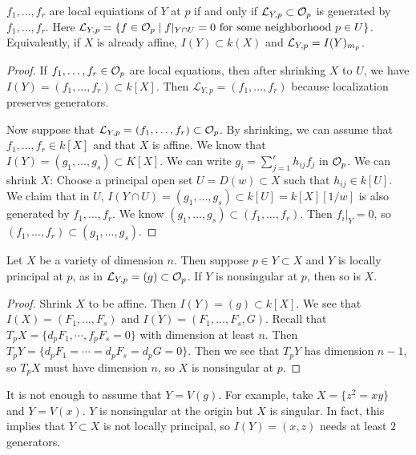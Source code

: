 \documentclass[twoside, 10pt]{article}
\begin{document}
    \begin{lem}
        $f_1, \ldots, f_r$ are local equiations of $Y$ at $p$ if and only if $\mathcal{L}_{Y,p} \subset \mathcal{O}_p$ is generated by $f_1, \ldots, f_r$. Here $\mathcal{L}_{Y,p} = \{f \in \mathcal{O}_p \mid f|_{Y \cap U} = 0 \text{ for some neighborhood } p \in U \}$. Equivalently, if $X$ is already affine, $I(Y) \subset k(X)$ and $\mathcal{L}_{Y,p} = I(Y)_{m_p}$.
        \begin{proof}
            If $f_1, \ldots, f_r \in \mathcal{O}_p$ are local equations, then after shrinking $X$ to $U$, we have $I(Y) = (f_1, \ldots, f_r) \subset k[X]$. Then $\mathcal{L}_{Y,p} = (f_1, \ldots, f_r)$ because localization preserves generators.

            Now suppose that $\mathcal{L}_{Y,p} = (f_1, \ldots, f_r) \subset \mathcal{O}_p$. By shrinking, we can assume that $f_1, \ldots, f_r \in k[X]$ and that $X$ is affine. We know that $I(Y) = (g_1, \ldots, g_s) \subset K[X]$. We can write $g_i = \sum_{j=1}^r h_{ij}f_j$ in $\mathcal{O}_p$. We can shrink $X$: Choose a principal open set $U = D(w) \subset X$ such that $h_{ij} \in k[U]$. We claim that in $U$, $I(Y \cap U) = (g_1, \ldots, g_s) \subset k[U]= k[X][1/w]$ is also generated by $f_1, \ldots, f_r$. We know $(g_1, \ldots, g_s) \subset (f_1, \ldots, f_r).$ Then $f_i|_Y = 0$, so $(f_1, \ldots, f_r) \subset (g_1, \ldots, g_s)$.
        \end{proof}
    \end{lem}
    
    \begin{thm}
        Let $X$ be a variety of dimension $n$. Then suppose $p \in Y \subset X$ and $Y$ is locally principal at $p$, as in $\mathcal{L}_{Y,p} = (g) \subset \mathcal{O}_p$. If $Y$ is nonsingular at $p$, then so is $X$.
        \begin{proof}
            Shrink $X$ to be affine. Then $I(Y) = (g) \subset k[X]$. We see that $I(X) = (F_1, \ldots, F_s)$ and $\overline{I(Y)} = (F_1, \ldots, F_s, G)$. Recall that $T_pX = \{d_pF_1, \cdots, f_pF_s = 0 \}$ with dimension at least $n$. Then $T_pY = \{d_pF_1 = \cdots = d_pF_s = d_pG = 0\}$. Then we see that $T_pY$ has dimension $n-1$, so $T_pX$ must have dimension $n$, so $X$ is nonsingular at $p$.
        \end{proof}
    \end{thm}
    
    \begin{rmk}
        It is not enough to assume that $Y = V(g)$. For example, take $X = \{z^2=xy\}$ and $Y = V(x)$. $Y$ is nonsingular at the origin but $X$ is singular. In fact, this implies that $Y \subset X$ is not locally principal, so $I(Y) = (x,z)$ needs at least $2$ generators.
    \end{rmk}
\end{document}
